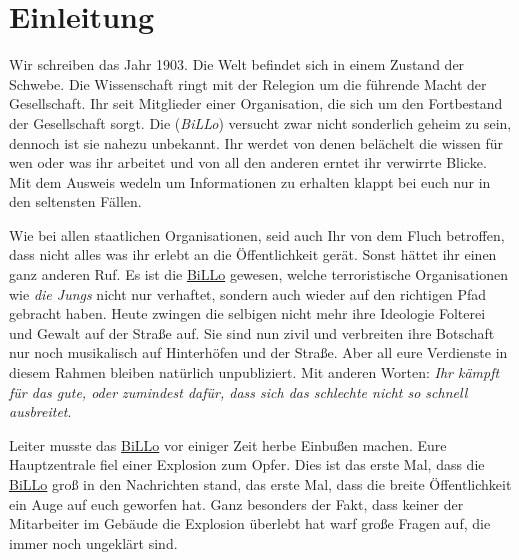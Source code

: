 \section{Einleitung}
    Wir schreiben das Jahr 1903. Die Welt befindet sich in einem Zustand der Schwebe. Die Wissenschaft ringt mit der Relegion um die führende Macht der Gesellschaft. Ihr seit Mitglieder einer Organisation, die sich um den Fortbestand der Gesellschaft sorgt. Die  (\emph{BiLLo}) versucht zwar nicht sonderlich geheim zu sein, dennoch ist sie nahezu unbekannt. Ihr werdet von denen belächelt die wissen für wen oder was ihr arbeitet und von all den anderen erntet ihr verwirrte Blicke. Mit dem Ausweis wedeln um Informationen zu erhalten klappt bei euch nur in den seltensten Fällen.

    Wie bei allen staatlichen Organisationen, seid auch Ihr von dem Fluch betroffen, dass nicht alles was ihr erlebt an die Öffentlichkeit gerät. Sonst hättet ihr einen ganz anderen Ruf. Es ist die \hyperref[subsubsec:billo]{BiLLo} gewesen, welche terroristische Organisationen wie \emph{die Jungs} nicht nur verhaftet, sondern auch wieder auf den richtigen Pfad gebracht haben. Heute zwingen die selbigen nicht mehr ihre Ideologie Folterei und Gewalt auf der Straße auf. Sie sind nun zivil und verbreiten ihre Botschaft nur noch musikalisch auf Hinterhöfen und der Straße. Aber all eure Verdienste in diesem Rahmen bleiben natürlich unpubliziert. Mit anderen Worten: \emph{Ihr kämpft für das gute, oder zumindest dafür, dass sich das schlechte nicht so schnell ausbreitet}.

    Leiter musste das \hyperref[subsubsec:billo]{BiLLo} vor einiger Zeit herbe Einbußen machen. Eure Hauptzentrale fiel einer Explosion zum Opfer. Dies ist das erste Mal, dass die \hyperref[subsubsec:billo]{BiLLo} groß in den Nachrichten stand, das erste Mal, dass die breite Öffentlichkeit ein Auge auf euch geworfen hat. Ganz besonders der Fakt, dass keiner der Mitarbeiter im Gebäude die Explosion überlebt hat warf große Fragen auf, die immer noch ungeklärt sind.
